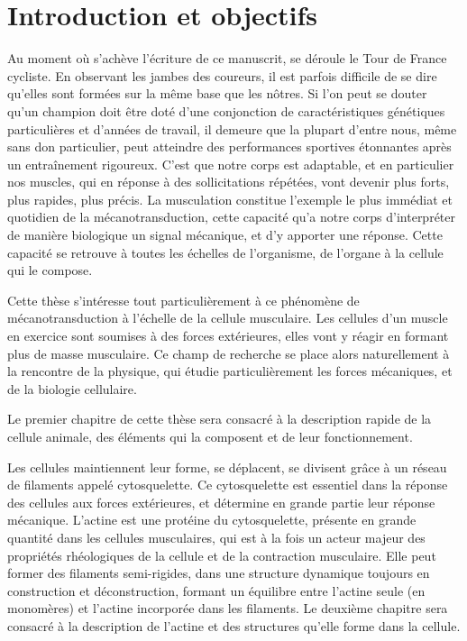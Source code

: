 \documentclass[10pt,twoside]{report}
\begin{document}
\chapter*{Introduction et objectifs}
  Au moment où s'achève l'écriture de ce manuscrit, se déroule le Tour de France cycliste. En observant les jambes des coureurs, il est parfois difficile de se dire qu'elles sont formées sur la même base que les nôtres. Si l'on peut se douter qu'un champion doit être doté d'une conjonction de caractéristiques génétiques particulières et d'années de travail, il demeure que la plupart d'entre nous, même sans don particulier, peut atteindre des performances sportives étonnantes après un entraînement rigoureux. C'est que notre corps est adaptable, et en particulier nos muscles, qui en réponse à des sollicitations répétées, vont devenir plus forts, plus rapides, plus précis. La musculation constitue l'exemple le plus immédiat et quotidien de la mécanotransduction, cette capacité qu'a notre corps d'interpréter de manière biologique un signal mécanique, et d'y apporter une réponse. Cette capacité se retrouve à toutes les échelles de l'organisme, de l'organe à la cellule qui le compose. 
  
  Cette thèse s'intéresse tout particulièrement à ce phénomène de mécanotransduction à l'échelle de la cellule musculaire. Les cellules d'un muscle en exercice sont soumises à des forces extérieures, elles vont y réagir en formant plus de masse musculaire. Ce champ de recherche se place alors naturellement à la rencontre de la physique, qui étudie particulièrement les forces mécaniques, et de la biologie cellulaire. 
  
  Le premier chapitre de cette thèse sera consacré à la description rapide de la cellule animale, des éléments qui la composent et de leur fonctionnement. 

	Les cellules maintiennent leur forme, se déplacent, se divisent grâce à un réseau de filaments appelé cytosquelette. Ce cytosquelette est essentiel dans la réponse des cellules aux forces extérieures, et détermine en grande partie leur réponse mécanique. L'actine est une protéine du cytosquelette, présente en grande quantité dans les cellules musculaires, qui est à la fois un acteur majeur des propriétés rhéologiques de la cellule et de la contraction musculaire. Elle peut former des filaments semi-rigides, dans une structure dynamique toujours en construction et déconstruction, formant un équilibre entre l'actine seule (en monomères) et l'actine incorporée dans les filaments.  Le deuxième chapitre sera consacré à la description de l'actine et des structures qu'elle forme dans la cellule. 
\end{document}
